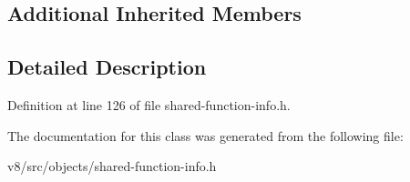 \subsection*{Additional Inherited Members}


\subsection{Detailed Description}


Definition at line 126 of file shared-\/function-\/info.\+h.



The documentation for this class was generated from the following file\+:\begin{DoxyCompactItemize}
\item 
v8/src/objects/shared-\/function-\/info.\+h\end{DoxyCompactItemize}
